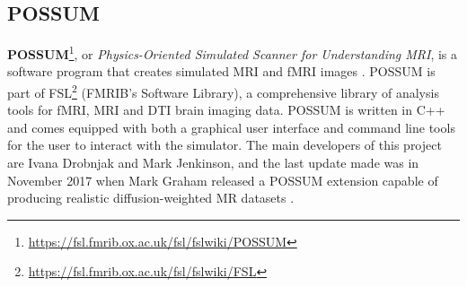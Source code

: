 \subsection{POSSUM}
\textbf{POSSUM}\footnote{\url{https://fsl.fmrib.ox.ac.uk/fsl/fslwiki/POSSUM}}, or \textit{Physics-Oriented Simulated Scanner for Understanding MRI}, is a software program that creates simulated MRI and fMRI images \cite{Drobnjak2006} \cite{Drobnjak2010}.
POSSUM is part of FSL\footnote{\url{https://fsl.fmrib.ox.ac.uk/fsl/fslwiki/FSL}} (FMRIB's Software Library), a comprehensive library of analysis tools for fMRI, MRI and DTI brain imaging data.
POSSUM is written in C++ and comes equipped with both a graphical user interface and command line tools for the user to interact with the simulator.
The main developers of this project are Ivana Drobnjak and Mark Jenkinson, and the last update made was in November 2017 when Mark Graham released a POSSUM extension capable of producing realistic diffusion-weighted MR datasets \cite{Graham2016}.

\hfill

